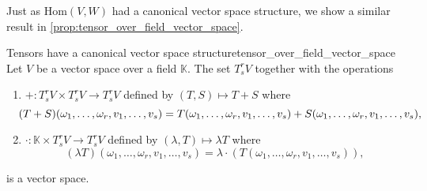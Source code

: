 Just as \(\mathrm{Hom}(V,W)\) had a canonical vector space structure, we show a similar result in \cref{prop:tensor_over_field_vector_space}.
\begin{proposition}{Tensors have a canonical vector space structure}{tensor_over_field_vector_space}
    Let \(V\) be a vector space over a field \(\mathbb{K}\). The set \(T_s^rV\) together with the operations
    \begin{enumerate}[label=(\alph*)]
        \item \(+: T_s^rV \times T_s^rV \to T_s^rV\) defined by \((T,S) \mapsto T+S\) where
            \begin{equation*}
                \hspace{-7pt}%
                (T+S)(\omega_1, \dots, \omega_r, v_1, \dots, v_s) = T(\omega_1, \dots, \omega_r, v_1, \dots, v_s) + S(\omega_1, \dots, \omega_r, v_1, \dots, v_s),
            \end{equation*}
        \item \(\cdot: \mathbb{K} \times T_s^rV \to T_s^rV\) defined by \((\lambda,T) \mapsto \lambda T\) where
            \begin{equation*}
                (\lambda T)(\omega_1, \dots, \omega_r, v_1, \dots, v_s) = \lambda \cdot \left(T(\omega_1, \dots, \omega_r, v_1, \dots, v_s)\right),
            \end{equation*}
    \end{enumerate}
    is a vector space.
\end{proposition}
